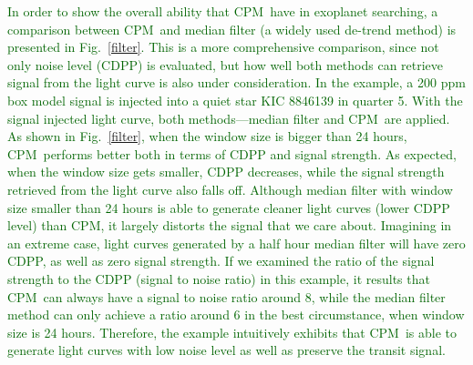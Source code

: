 \documentclass[12pt, preprint]{aastex}
\newcommand{\name}{CPM}
\newcommand{\revise}[1]{\textcolor{darkgreen}{#1}}
\begin{document}
\revise{In order to show the overall ability that \name\ have in exoplanet searching, a comparison between \name\ and median filter (a widely used de-trend method) is presented in Fig.~\ref{filter}. This is a more comprehensive comparison, since not only noise level (CDPP) is evaluated,  but how well both methods can retrieve signal from the light curve is also under consideration. In the example, a 200 ppm box model signal is injected into a quiet star KIC 8846139 in quarter 5. With the signal injected light curve,  both methods---median filter and \name\ are applied. As shown in Fig.~\ref{filter}, when  the window size is bigger than 24 hours, \name\ performs better both in terms of CDPP and signal strength. As expected, when the window size gets smaller, CDPP decreases,  while the signal strength retrieved from the light curve also falls off. Although median filter with window size smaller than 24 hours is able to generate cleaner light curves (lower CDPP level) than \name, it largely distorts the signal that we care about. Imagining in an extreme case, light curves generated by a half hour median filter will have zero CDPP, as well as zero signal strength. If we examined the ratio of the signal strength to the CDPP (signal to noise ratio) in this example, it results that \name\ can always have a signal to noise ratio around 8, while the median filter method can only achieve a ratio around 6 in the best circumstance, when window size is 24 hours. Therefore, the example intuitively exhibits that \name\ is able to generate light curves with low noise level as well as preserve the transit signal.}
\end{document}
